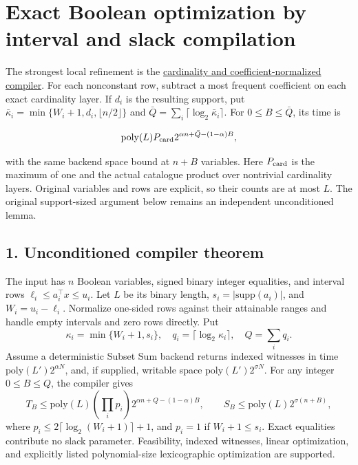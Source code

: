 
\hypertarget{af-c97649ed9d-exact-boolean-optimization-by-interval-and-slack-compilation}{%
\section{Exact Boolean optimization by interval and slack compilation}\label{af-c97649ed9d-exact-boolean-optimization-by-interval-and-slack-compilation}}

The strongest local refinement is the \href{https://github.com/icekylinx/algorithm-frontier/blob/main/problems/boolean-linear-compiler/manuscripts/cardinality-and-modal-interval-compilation.md}{cardinality and coefficient-normalized compiler}. For each nonconstant row, subtract a most frequent coefficient on each exact cardinality layer. If \(d_i\) is the resulting support, put \(\bar\kappa_i=\min\{W_i+1,d_i,\lfloor n/2\rfloor\}\) and \(\bar Q=\sum_i\lceil\log_2\bar\kappa_i\rceil\). For \(0\le B\le\bar Q\), its time is

\[
\mathrm{poly}(L)P_{\rm card}
2^{\alpha n+\bar Q-(1-\alpha)B},
\]

with the same backend space bound at \(n+B\) variables. Here \(P_{\rm card}\) is the maximum of one and the actual catalogue product over nontrivial cardinality layers. Original variables and rows are explicit, so their counts are at most \(L\). The original support-sized argument below remains an independent unconditioned lemma.

\hypertarget{af-c97649ed9d-unconditioned-compiler-theorem}{%
\subsection{1. Unconditioned compiler theorem}\label{af-c97649ed9d-unconditioned-compiler-theorem}}

The input has \(n\) Boolean variables, signed binary integer equalities, and interval rows \(\ell_i\le a_i^\top x\le u_i\). Let \(L\) be its binary length, \(s_i=|\mathrm{supp}(a_i)|\), and \(W_i=u_i-\ell_i\). Normalize one-sided rows against their attainable ranges and handle empty intervals and zero rows directly. Put \[
\kappa_i=\min\{W_i+1,s_i\},\quad q_i=\lceil\log_2\kappa_i\rceil,\quad Q=\sum_iq_i.
\] Assume a deterministic Subset Sum backend returns indexed witnesses in time \(\mathrm{poly}(L')2^{\alpha N}\), and, if supplied, writable space \(\mathrm{poly}(L')2^{\sigma N}\). For any integer \(0\le B\le Q\), the compiler gives \[
T_B\le\mathrm{poly}(L)\left(\prod_i p_i\right)
2^{\alpha n+Q-(1-\alpha)B},\qquad
S_B\le\mathrm{poly}(L)2^{\sigma(n+B)},
\] where \(p_i\le2\lceil\log_2(W_i+1)\rceil+1\), and \(p_i=1\) if \(W_i+1\le s_i\). Exact equalities contribute no slack parameter. Feasibility, indexed witnesses, linear optimization, and explicitly listed polynomial-size lexicographic optimization are supported.

